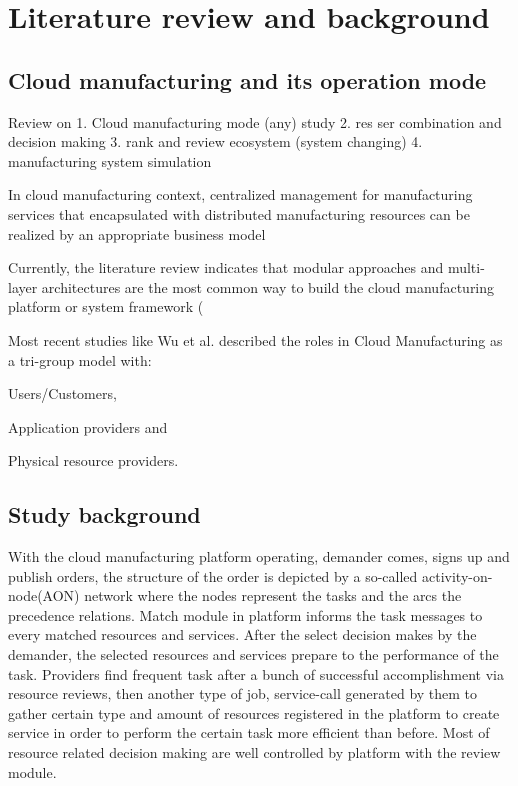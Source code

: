 \section{Literature review and background} %
\label{sec:literature_review}
\subsection{Cloud manufacturing and its operation mode} %
\label{sub:cloud_manufacturing review}

Review on 1. Cloud manufacturing mode (any) study 
2. res ser combination and decision making
3. rank and review ecosystem (system changing)
4. manufacturing system simulation

In cloud manufacturing context, centralized management for manufacturing services that encapsulated with distributed manufacturing resources can be realized by an appropriate business model\cite{Xu2012}

Currently, the literature review indicates that modular approaches and multi-layer architectures are the most common way to build the cloud manufacturing platform or system framework (\cite{Tao2012}\cite{Valilai2013}




Most recent studies like Wu et al.\cite{Wu2013} described the roles in Cloud Manufacturing as a tri-group model with:\begin{inparaenum}[1)]
\item Users/Customers,
\item Application providers and
\item Physical resource providers.
\end{inparaenum}


\subsection{Study background} %
\label{sub:background}

With the cloud manufacturing platform operating, demander comes, signs up and publish orders, the structure of the order is depicted by a so-called activity-on-node(AON) network where the nodes represent the tasks and the arcs the precedence relations. Match module in platform informs the task messages to every matched resources and services. After the select decision makes by the demander, the selected resources and services prepare to the performance of the task.
Providers find frequent task after a bunch of successful accomplishment via resource reviews, then another type of job, service-call generated by them to gather certain type and amount of resources registered in the platform to create service in order to perform the certain task more efficient than before. Most of resource related decision making are well controlled by platform with the review module.



